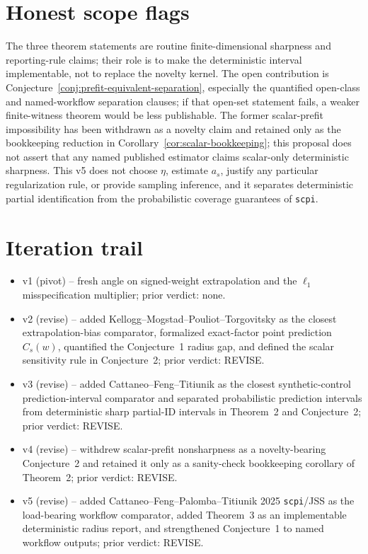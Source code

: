 \documentclass[11pt]{article}
\theoremstyle{definition}
\theoremstyle{plain}
\theoremstyle{remark}
\begin{document}
\section{Honest scope flags}
The three theorem statements are routine finite-dimensional sharpness and reporting-rule claims; their role is to make the deterministic interval implementable, not to replace the novelty kernel. The open contribution is Conjecture~\ref{conj:prefit-equivalent-separation}, especially the quantified open-class and named-workflow separation clauses; if that open-set statement fails, a weaker finite-witness theorem would be less publishable. The former scalar-prefit impossibility has been withdrawn as a novelty claim and retained only as the bookkeeping reduction in Corollary~\ref{cor:scalar-bookkeeping}; this proposal does not assert that any named published estimator claims scalar-only deterministic sharpness. This v5 does not choose \(\eta\), estimate \(a_s\), justify any particular regularization rule, or provide sampling inference, and it separates deterministic partial identification from the probabilistic coverage guarantees of \texttt{scpi}.

\section{Iteration trail}
\begin{itemize}[leftmargin=*]
\item v1 (pivot) -- fresh angle on signed-weight extrapolation and the \(\ell_1\) misspecification multiplier; prior verdict: none.
\item v2 (revise) -- added Kellogg--Mogstad--Pouliot--Torgovitsky as the closest extrapolation-bias comparator, formalized exact-factor point prediction \(C_s(w)\), quantified the Conjecture~1 radius gap, and defined the scalar sensitivity rule in Conjecture~2; prior verdict: REVISE.
\item v3 (revise) -- added Cattaneo--Feng--Titiunik as the closest synthetic-control prediction-interval comparator and separated probabilistic prediction intervals from deterministic sharp partial-ID intervals in Theorem~2 and Conjecture~2; prior verdict: REVISE.
\item v4 (revise) -- withdrew scalar-prefit nonsharpness as a novelty-bearing Conjecture~2 and retained it only as a sanity-check bookkeeping corollary of Theorem~2; prior verdict: REVISE.
\item v5 (revise) -- added Cattaneo--Feng--Palomba--Titiunik 2025 \texttt{scpi}/JSS as the load-bearing workflow comparator, added Theorem~3 as an implementable deterministic radius report, and strengthened Conjecture~1 to named workflow outputs; prior verdict: REVISE.
\end{itemize}
\end{document}
